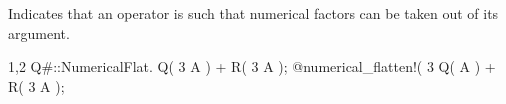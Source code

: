 
Indicates that an operator is such that numerical factors can be taken
out of its argument.
\begin{screen}{1,2}
Q{#}::NumericalFlat.
Q( 3 A ) + R( 3 A );
@numerical_flatten!(%
3 Q( A ) + R( 3 A );
\end{screen}
~

